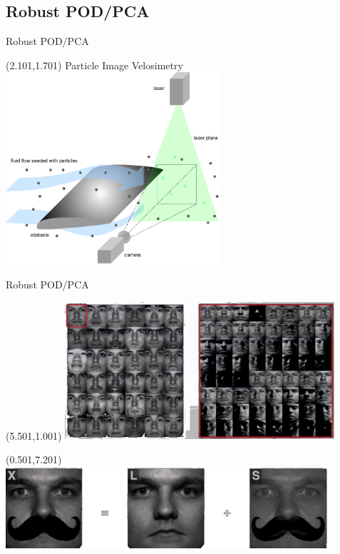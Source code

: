 \documentclass[aspectratio=169]{beamer}
\begin{document}
\subsection{Robust POD/PCA}
\begin{frame}{Robust POD/PCA}
	\begin{textblock}{13}(2.101,1.701)
	\qquad \qquad \qquad \qquad \qquad Particle Image Velosimetry
	\includegraphics[width=8cm]{imgs/piv.png}
	\end{textblock}
\end{frame}

\begin{frame}{Robust POD/PCA}
\begin{textblock}{13}(5.501,1.001)
	\includegraphics[width=10cm]{imgs/faces2.png}
\end{textblock}
\begin{textblock}{13}(0.501,7.201)
	\includegraphics[width=12cm]{imgs/faces1.png}
\end{textblock}
\end{frame}
\end{document}

